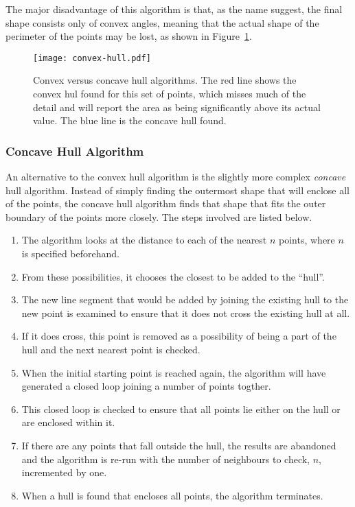 The major disadvantage of this algorithm is that, as the name suggest, the
final shape consists only of convex angles, meaning that the actual shape of
the perimeter of the points may be lost, as shown in
Figure~\ref{fig:convex-hull}.

\begin{figure}[tbhp]
	\centering
	\texttt{[image: convex-hull.pdf]}

	\caption[Convex versus concave hull algorithms.]{Convex versus concave hull
		algorithms. The red line shows the convex hul found for this set of
		points, which misses much of the detail and will report the area as
		being significantly above its actual value. The blue line is the
		concave hull found.}\label{fig:convex-hull}
\end{figure}

\subsubsection*{Concave Hull Algorithm}
\label{ssub:Concave Hull Algorithm}

An alternative to the convex hull algorithm is the slightly more complex
\emph{concave} hull algorithm\cite{moreira2007concave}. Instead of simply
finding the outermost shape that will enclose all of the points, the concave
hull algorithm finds that shape that fits the outer boundary of the points more
closely. The steps involved are listed below.

\begin{enumerate}
	\item The algorithm looks at the distance to each of the nearest $n$
		points, where $n$ is specified beforehand.
	\item From these possibilities, it chooses the closest to be added to the
		``hull''.
	\item The new line segment that would be added by joining the existing hull
		to the new point is examined to ensure that it does not cross the
		existing hull at all.
	\item If it does cross, this point is removed as a possibility of being a
		part of the hull and the next nearest point is checked.
	\item When the initial starting point is reached again, the algorithm will
		have generated a closed loop joining a number of points togther.
	\item This closed loop is checked to ensure that all points lie either on
		the hull or are enclosed within it.
	\item If there are any points that fall outside the hull, the results are
		abandoned and the algorithm is re-run with the number of neighbours to
		check, $n$, incremented by one.
	\item When a hull is found that encloses all points, the algorithm
		terminates.
\end{enumerate}

